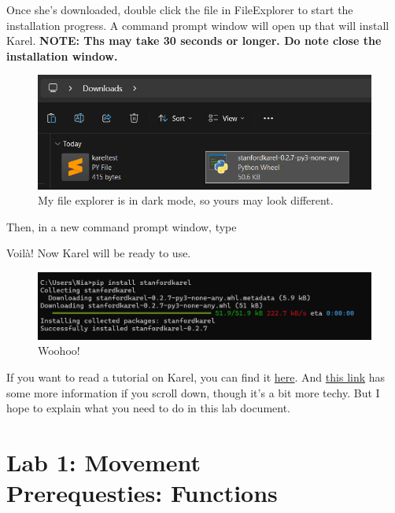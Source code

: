 \documentclass[12pt]{scrartcl}
\begin{document}
Once she's downloaded, double click the file in FileExplorer to start the installation progress. A command prompt window will open up that will install Karel. \textbf{NOTE: Ths may take 30 seconds or longer. Do note close the installation window.}

\begin{figure}[H]
    \centering
    \includegraphics[scale=0.55]{Installation Part 1.png}
    \caption*{My file explorer is in dark mode, so yours may look different.}
\end{figure}

Then, in a new command prompt window, type
\begin{center}
\end{center}

Voil\`a! Now Karel will be ready to use.

\begin{figure}[H]
    \centering
    \includegraphics[scale=0.6]{Installation Part 2.png}
    \caption*{Woohoo!}
\end{figure}

If you want to read a tutorial on Karel, you can find it \href{https://compedu.stanford.edu/karel-reader/docs/python/en/chapter1.html}{here}. And \href{https://github.com/TylerYep/stanfordkarel}{this link} has some more information if you scroll down, though it's a bit more techy. But I hope to explain what you need to do in this lab document.

\newpage
\section*{Lab 1: Movement \\
{\small Prerequesties: Functions}
}
\end{document}
